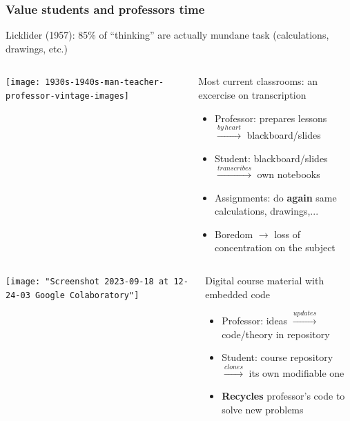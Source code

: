 \documentclass[aspectratio=169]{beamer}
\begin{document}
\begin{frame}
	\frametitle{Value students and professors time}
	Licklider (1957): 85\% of ``thinking'' are actually mundane task (calculations, drawings, etc.)
	\pause
	\begin{block}{}
	  \begin{columns}[b]
			\begin{column}{0.25\textwidth}
				\texttt{[image: 1930s-1940s-man-teacher-professor-vintage-images]}
			\end{column}
			\begin{column}{0.65\textwidth}
				Most current classrooms: an excercise on transcription
				\begin{itemize}[<+->]
					\item Professor: prepares lessons \(\xrightarrow{by\, heart}\) blackboard/slides
					\item Student: blackboard/slides \(\xrightarrow{transcribes}\) own notebooks
					\item Assignments: do \textbf{again} same calculations, drawings,...
					\item Boredom \(\rightarrow \) loss of concentration on the subject
				\end{itemize}
			\end{column}
		\end{columns}
	\end{block}
	\pause
	\begin{block}{}
	  \begin{columns}[b]
			\begin{column}{0.25\textwidth}
				\texttt{[image: "Screenshot 2023-09-18 at 12-24-03 Google Colaboratory"]}
			\end{column}
			\begin{column}{0.65\textwidth}
				Digital course material with embedded code
				\begin{itemize}[<+->]
					\item Professor: ideas \(\xrightarrow{updates}\) code/theory in repository
					\item Student: course repository \(\xrightarrow{clones}\) its own modifiable one
					\item \textbf{Recycles} professor's code to solve new problems
				\end{itemize}
			\end{column}
		\end{columns}
	\end{block}
\end{frame}
\end{document}
